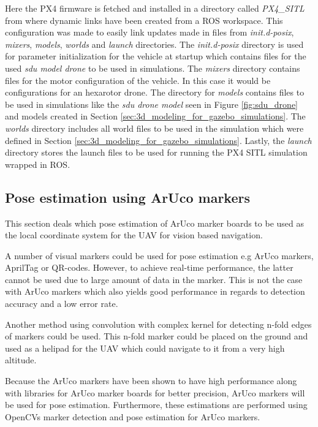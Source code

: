 \documentclass[../Head/report.tex]{subfiles}
\begin{document}
Here the PX4 firmware is fetched and installed in a directory called \textit{PX4\_SITL} from where dynamic links have been created from a ROS workspace. This configuration was made to easily link updates made in files from \textit{init.d-posix}, \textit{mixers}, \textit{models}, \textit{worlds} and \textit{launch} directories. The \textit{init.d-posix} directory is used for parameter initialization for the vehicle at startup which contains files for the used \textit{sdu model drone} to be used in simulations. The \textit{mixers} directory contains files for the motor configuration of the vehicle. In this case it would be configurations for an hexarotor drone. The directory for \textit{models} contains files to be used in simulations like the \textit{sdu drone model} seen in Figure  \ref{fig:sdu_drone} and models created in Section \ref{sec:3d_modeling_for_gazebo_simulations}. The \textit{worlds} directory includes all world files to be used in the simulation which were defined in Section \ref{sec:3d_modeling_for_gazebo_simulations}. Lastly, the \textit{launch} directory stores the launch files to be used for running the PX4 SITL simulation wrapped in ROS.   

\subsection{Pose estimation using ArUco markers}
\label{sec:pose_estimation_using_aruco_markers}

This section deals which pose estimation of ArUco marker boards to be used as the local coordinate system for the UAV for vision based navigation. 

A number of visual markers could be used for pose estimation e.g ArUco markers, AprilTag or QR-codes. However, to achieve real-time performance, the latter cannot be used due to large amount of data in the marker. This is not the case with ArUco markers which also yields good performance in regards to detection accuracy and a low error rate. \cite{visualmarkers} 

Another method using convolution with complex kernel for detecting n-fold edges of markers could be used.\cite{nFoldMarkers} This n-fold marker could be placed on the ground and used as a helipad for the UAV which could navigate to it from a very high altitude.  

Because the ArUco markers have been shown to have high performance along with libraries for ArUco marker boards for better precision, ArUco markers will be used for pose estimation. Furthermore, these estimations are performed using OpenCVs marker detection and pose estimation for ArUco markers.
\end{document}
